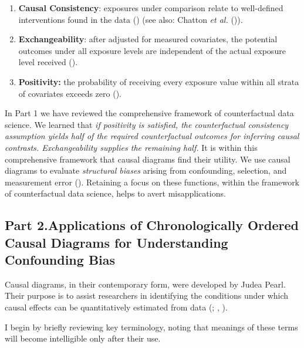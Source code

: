 \documentclass[
  singlecolumn,
  9pt]{article}
\begin{document}
\begin{enumerate}
\def\labelenumi{\arabic{enumi}.}
\item
  \textbf{Causal Consistency}: exposures under comparison relate to
  well-defined interventions found in the data
  () (see also:
  Chatton \emph{et al.} ()).
\item
  \textbf{Exchangeability}: after adjusted for measured covariates, the
  potential outcomes under all exposure levels are independent of the
  actual exposure level received ().
\item
  \textbf{Positivity:} the probability of receiving every exposure value
  within all strata of covariates exceeds zero
  ().
\end{enumerate}

In Part 1 we have reviewed the comprehensive framework of counterfactual
data science. We learned that \emph{if positivity is satisfied, the
counterfactual consistency assumption yields half of the required
counterfactual outcomes for inferring causal contrasts. Exchangeability
supplies the remaining half.} It is within this comprehensive framework
that causal diagrams find their utility. We use causal diagrams to
evaluate \emph{structural biases} arising from confounding, selection,
and measurement error (). Retaining a focus on these functions, within the framework of
counterfactual data science, helps to avert misapplications.

\subsection{Part 2.Applications of Chronologically Ordered Causal
Diagrams for Understanding Confounding
Bias}\label{part-2.applications-of-chronologically-ordered-causal-diagrams-for-understanding-confounding-bias}

Causal diagrams, in their contemporary form, were developed by Judea
Pearl. Their purpose is to assist researchers in identifying the
conditions under which causal effects can be quantitatively estimated
from data (;
, ).

I begin by briefly reviewing key terminology, noting that meanings of
these terms will become intelligible only after their use.
\end{document}
